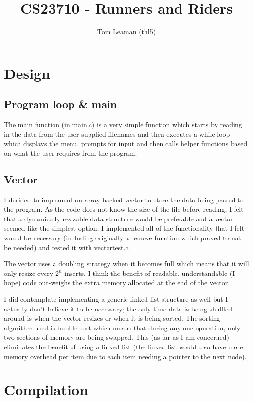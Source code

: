 \documentclass[a4paper, twoside]{article}
\title{CS23710 - Runners and Riders}
\author{Tom Leaman (thl5)}
\begin{document}
\maketitle

\section{Design}
\subsection{Program loop \& main}
The main function (in main.c) is a very simple function which starts by reading
in the data from the user supplied filenames and then executes a while loop
which displays the menu, prompts for input and then calls helper functions
based on what the user requires from the program.

\subsection{Vector}
I decided to implement an array-backed vector to store the data being passed to
the program. As the code does not know the size of the file before reading, I
felt that a dynamically resizable data structure would be preferable and a
vector seemed like the simplest option. I implemented all of the functionality
that I felt would be necessary (including originally a remove function which
proved to not be needed) and tested it with vectortest.c.

The vector uses a doubling strategy when it becomes full which means that it
will only resize every $2^n$ inserts. I think the benefit of readable,
understandable (I hope) code out-weighs the extra memory allocated at the
end of the vector.

I did contemplate implementing a generic linked list structure as well but I
actually don't believe it to be necessary; the only time data is being shuffled
around is when the vector resizes or when it is being sorted. The sorting
algorithm used is bubble sort which means that during any one operation, only
two sections of memory are being swapped. This (as far as I am concerned)
eliminates the benefit of using a linked list (the linked list would also have
more memory overhead per item due to each item needing a pointer to the next
node).

\section{Compilation}
\end{document}
